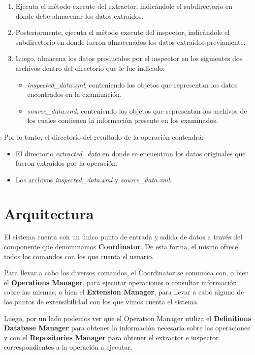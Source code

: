 \begin{enumerate}
\item Ejecuta el método execute del extractor, indicándole el subdirectorio en donde debe almacenar los datos extraídos.
\item Posteriormente, ejecuta el método execute del inspector, indicándole el subdirectorio en donde fueron almacenados los datos extraídos previamente.
\item Luego, almacena los datos producidos por el inspector en los siguientes dos archivos dentro del directorio que le fue indicado:
    \begin{itemize}
    \item \emph{inspected\_data.xml}, conteniendo los objetos que representan los datos encontrados en la examinación.
    \item \emph{source\_data.xml}, conteniendo los objetos que representan los archivos de los cuales contienen la información presente en los examinados.
    \end{itemize}
\end{enumerate}

Por lo tanto, el directorio del resultado de la operación contendrá:
\begin{itemize}
\item El directorio \emph{extracted\_data} en donde se encuentran los datos originales que fueron extraídos por la operación.
\item Los archivos \emph{inspected\_data.xml} y \emph{source\_data.xml}.
\end{itemize}

\section{Arquitectura} \label{arquitectura}
El sistema cuenta con un único punto de entrada y salida de datos a través del componente que denominamos \textbf{Coordinator}. De esta forma, el mismo ofrece todos los comandos con los que cuenta el usuario.

Para llevar a cabo los diversos comandos, el Coordinator se comunica con, o bien el \textbf{Operations Manager}, para ejecutar operaciones o consultar información sobre las mismas; o bien el \textbf{Extension Manager}, para llevar a cabo alguno de los puntos de extensibilidad con los que vimos cuenta el sistema.

Luego, por un lado podemos ver que el Operation Manager utiliza el \textbf{Definitions Database Manager} para obtener la información necesaria sobre las operaciones y con el \textbf{Repositories Manager} para obtener el extractor e inspector correspondientes a la operación a ejecutar.

